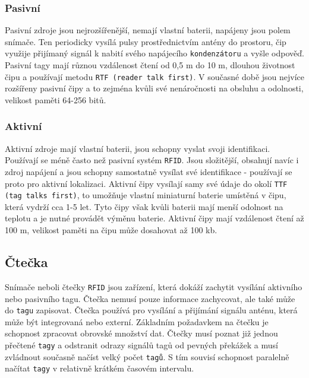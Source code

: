 \documentclass[czech,BP]{thesiskiv}
\begin{document}
\subsubsection{Pasivní}
Pasivní zdroje jsou nejrozšířenější, nemají vlastní baterii, napájeny jsou polem snímače. Ten periodicky vysílá pulsy prostřednictvím antény do prostoru, čip využije přijímaný signál k nabití svého napájecího \texttt{kondenzátoru} a vyšle odpověď. Pasivní tagy mají různou vzdálenost čtení od 0,5 m do 10 m, dlouhou životnost čipu a používají metodu \texttt{RTF (reader talk first)}. V současné době jsou nejvíce rozšířeny pasivní čipy a to zejména kvůli své nenáročnosti na obsluhu a odolnosti, velikost paměti 64-256 bitů.\cite{dolevcek2010identifikace}
\subsubsection{Aktivní}
Aktivní zdroje mají vlastní baterii, jsou schopny vyslat svoji identifikaci. Používají se méně často než pasivní systém \texttt{RFID}. Jsou složitější, obsahují navíc i zdroj napájení a jsou schopny samostatně vysílat své identifikace - používají se proto pro aktivní lokalizaci.
Aktivní čipy vysílají samy své údaje do okolí \texttt{TTF (tag talks first)}, to umožňuje vlastní miniaturní baterie umístěná v čipu, která vydrží cca 1-5 let. Tyto čipy však kvůli baterii mají menší odolnost na teplotu a je nutné provádět výměnu baterie. Aktivní čipy mají vzdálenost čtení až 100 m, velikost paměti na čipu může dosahovat až 100 kb.\cite{dolevcek2010identifikace}


\subsection{Čtečka}
Snímače neboli čtečky \texttt{RFID} jsou zařízení, která dokáží zachytit vysílání aktivního nebo pasivního tagu. Čtečka nemusí pouze informace zachycovat, ale také může do \texttt{tagu} zapisovat. Čtečka používá pro vysílání a přijímání signálu anténu, která může být integrovaná nebo externí. Základním požadavkem na čtečku je schopnost zpracovat obrovské množství dat. Čtečky musí poznat již jednou přečtené \texttt{tagy} a odstranit odrazy signálů tagů od pevných překážek a musí zvládnout současně načíst velký počet \texttt{tagů}. S tím souvisí schopnost paralelně načítat \texttt{tagy} v relativně krátkém časovém intervalu.\cite{dolevcek2010identifikace}	
	
	
	
	
	
\end{document}

